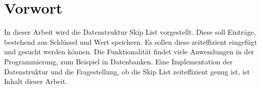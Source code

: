 \documentclass{TUBAFarbeiten}
\begin{document}
\maketitle
\tableofcontents
\newpage

\section{Vorwort}
In dieser Arbeit wird die Datenstruktur Skip List vorgestellt. Diese soll Einträge, bestehend aus Schlüssel und Wert speichern. Es sollen diese zeiteffizient eingefügt und gesucht werden können. Die Funktionalität findet viele Anwendungen in der Programmierung, zum Beispiel in Datenbanken. Eine Implementation der Datenstruktur und die Fragestellung, ob die Skip List zeiteffizient genug ist, ist Inhalt dieser Arbeit.
\end{document}
